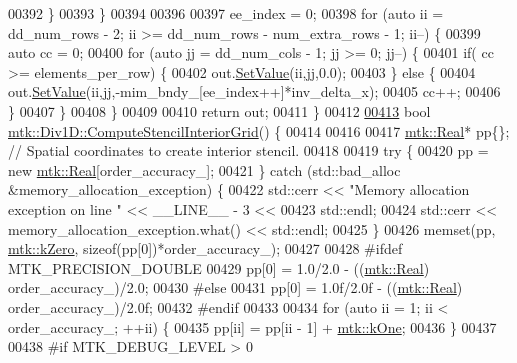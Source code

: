\begin{DoxyCode}
{{00392     \}
00393   \}
00394 
00396 
00397   ee\_index = 0;
00398   \textcolor{keywordflow}{for} (\textcolor{keyword}{auto} ii = dd\_num\_rows - 2; ii >= dd\_num\_rows - num\_extra\_rows - 1; ii--) \{
00399     \textcolor{keyword}{auto} cc = 0;
00400     \textcolor{keywordflow}{for} (\textcolor{keyword}{auto} jj = dd\_num\_cols - 1; jj >= 0; jj--) \{
00401       \textcolor{keywordflow}{if}( cc >= elements\_per\_row) \{
00402         out.\hyperlink{classmtk_1_1DenseMatrix_ae0f873a6d3a734da467cafb817da64ae}{SetValue}(ii,jj,0.0);
00403       \} \textcolor{keywordflow}{else} \{
00404         out.\hyperlink{classmtk_1_1DenseMatrix_ae0f873a6d3a734da467cafb817da64ae}{SetValue}(ii,jj,-mim\_bndy\_[ee\_index++]*inv\_delta\_x);
00405         cc++;
00406       \}
00407      \}
00408   \}
00409 
00410   \textcolor{keywordflow}{return} out;
00411 \}
00412 
\hypertarget{mtk__div__1d_8cc_source_l00413}{}\hyperlink{classmtk_1_1Div1D_a3eb3a32862a6b066cd583cbbd00a6509}{00413} \textcolor{keywordtype}{bool} \hyperlink{classmtk_1_1Div1D_a3eb3a32862a6b066cd583cbbd00a6509}{mtk::Div1D::ComputeStencilInteriorGrid}() \{
00414 
00416 
00417   \hyperlink{group__c01-roots_gac080bbbf5cbb5502c9f00405f894857d}{mtk::Real}* pp\{\}; \textcolor{comment}{// Spatial coordinates to create interior stencil.}
00418 
00419   \textcolor{keywordflow}{try} \{
00420     pp = \textcolor{keyword}{new} \hyperlink{group__c01-roots_gac080bbbf5cbb5502c9f00405f894857d}{mtk::Real}[order\_accuracy\_];
00421   \} \textcolor{keywordflow}{catch} (std::bad\_alloc &memory\_allocation\_exception) \{
00422     std::cerr << \textcolor{stringliteral}{"Memory allocation exception on line "} << \_\_LINE\_\_ - 3 <<
00423       std::endl;
00424     std::cerr << memory\_allocation\_exception.what() << std::endl;
00425   \}
00426   memset(pp, \hyperlink{group__c01-roots_ga59a451a5fae30d59649bcda274fea271}{mtk::kZero}, \textcolor{keyword}{sizeof}(pp[0])*order\_accuracy\_);
00427 
00428 \textcolor{preprocessor}{  #ifdef MTK\_PRECISION\_DOUBLE}
00429   pp[0] = 1.0/2.0 - ((\hyperlink{group__c01-roots_gac080bbbf5cbb5502c9f00405f894857d}{mtk::Real}) order\_accuracy\_)/2.0;
00430 \textcolor{preprocessor}{  #else}
00431   pp[0] = 1.0f/2.0f - ((\hyperlink{group__c01-roots_gac080bbbf5cbb5502c9f00405f894857d}{mtk::Real}) order\_accuracy\_)/2.0f;
00432 \textcolor{preprocessor}{  #endif}
00433 
00434   \textcolor{keywordflow}{for} (\textcolor{keyword}{auto} ii = 1; ii < order\_accuracy\_; ++ii) \{
00435     pp[ii] = pp[ii - 1] + \hyperlink{group__c01-roots_ga26407c24d43b6b95480943340d285c71}{mtk::kOne};
00436   \}
00437 
00438 \textcolor{preprocessor}{  #if MTK\_DEBUG\_LEVEL > 0}
}}
\end{DoxyCode}
